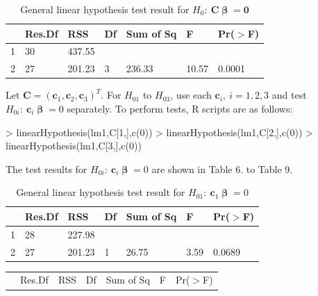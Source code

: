 \documentclass[12pt]{article} %
\begin{document}
\begin{enumerate}
\begin{itemize}
\begin{itemize}
\begin{table}[ht]
\begin{center}
\begin{tabular}{lllllll}
  \hline
 & Res.Df & RSS & Df & Sum of Sq & F & Pr($>$F) \\ 
  \hline
1 & 30 & 437.55 &  &  &  &  \\ 
  2 & 27 & 201.23 & 3 & 236.33 & 10.57 & 0.0001 \\ 
   \hline
\end{tabular}
\caption{General linear hypothesis test result for
		 $H_{0}:~\mathbf{C}\pmb{\upbeta}=\mathbf{0}$}
\end{center}
\end{table}		  Let $\mathbf{C}=(\mathbf{c}_{1},\mathbf{c}_{2},\mathbf{c}_{3})^{T}$. 
		  For $H_{01}$ to $H_{03}$, use each $\mathbf{c}_{i},~i=1,2,3$ and test 
		  $H_{0i}:~\mathbf{c}_{i}\pmb{\upbeta}=0$ separately. To perform tests, R scripts are as follows: 
\begin{Schunk}
\begin{Sinput}
> linearHypothesis(lm1,C[1,],c(0))
> linearHypothesis(lm1,C[2,],c(0))
> linearHypothesis(lm1,C[3,],c(0))
\end{Sinput}
\end{Schunk}
		  The test results for $H_{0i}:~\mathbf{c}_{i}\pmb{\upbeta}=0$ are shown in Table 6. to Table 9.
		  \newpage
\begin{table}[ht]
\begin{center}
\begin{tabular}{lllllll}
  \hline
 & Res.Df & RSS & Df & Sum of Sq & F & Pr($>$F) \\ 
  \hline
1 & 28 & 227.98 &  &  &  &  \\ 
  2 & 27 & 201.23 & 1 & 26.75 & 3.59 & 0.0689 \\ 
   \hline
\end{tabular}
\caption{General linear hypothesis test result for
		 $H_{01}:~\mathbf{c}_{1}\pmb{\upbeta}=0$}
\end{center}
\end{table}%
\begin{table}[ht]
\begin{center}
\begin{tabular}{lllllll}
  \hline
 & Res.Df & RSS & Df & Sum of Sq & F & Pr($>$F) \\ 

\end{tabular}
\end{center}
\end{table}
\end{itemize}
\end{itemize}
\end{enumerate}
\end{document}
